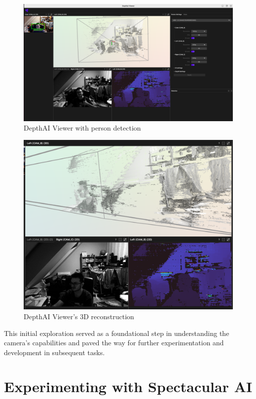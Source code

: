 \begin{figure}[htbp]
	\centering
	\includegraphics[width=150mm, keepaspectratio]{figures/depthai_viewer.png}
	\caption{DepthAI Viewer with person detection}
	\label{fig:DAI_person_detection}
\end{figure}

\begin{figure}[htbp]
	\centering
	\includegraphics[width=150mm, keepaspectratio]{figures/depthai_viewer_3d.png}
	\caption{DepthAI Viewer's 3D reconstruction}
	\label{fig:DAI_3d}
\end{figure}

This initial exploration served as a foundational step in understanding the camera's capabilities and paved the way for further experimentation and development in subsequent tasks.


\section{Experimenting with Spectacular AI} \label{experiments_spai}

